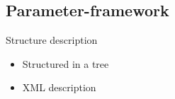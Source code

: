 \begin{FrameWithSubSection}
\end{FrameWithSubSection}


\subsection{Parameter-framework}
\begin{FrameWithSubSection}
    \begin{minipage}{0.49\textwidth}
    \begin{block}{Structure description}
        \begin{itemize}
            \item Structured in a tree
            \item XML description
        \end{itemize}
    \end{block}
    \end{minipage}
    \begin{minipage}{0.49\textwidth}
    \end{minipage}
\end{FrameWithSubSection}

